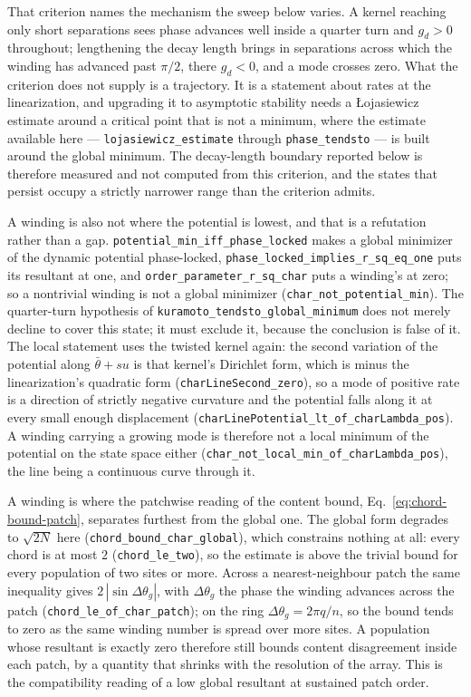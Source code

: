 \documentclass{article}
\begin{document}
That criterion names the mechanism the sweep below varies. A kernel reaching only short separations sees phase advances well inside a quarter turn and $g_d>0$ throughout; lengthening the decay length brings in separations across which the winding has advanced past $\pi/2$, there $g_d<0$, and a mode crosses zero. What the criterion does not supply is a trajectory. It is a statement about rates at the linearization, and upgrading it to asymptotic stability needs a \L{}ojasiewicz estimate around a critical point that is not a minimum, where the estimate available here --- \nolinkurl{lojasiewicz_estimate} through \nolinkurl{phase_tendsto} --- is built around the global minimum. The decay-length boundary reported below is therefore measured and not computed from this criterion, and the states that persist occupy a strictly narrower range than the criterion admits.

A winding is also not where the potential is lowest, and that is a refutation rather than a gap. \nolinkurl{potential_min_iff_phase_locked} makes a global minimizer of the dynamic potential phase-locked, \nolinkurl{phase_locked_implies_r_sq_eq_one} puts its resultant at one, and \nolinkurl{order_parameter_r_sq_char} puts a winding's at zero; so a nontrivial winding is not a global minimizer (\nolinkurl{char_not_potential_min}). The quarter-turn hypothesis of \nolinkurl{kuramoto_tendsto_global_minimum} does not merely decline to cover this state; it must exclude it, because the conclusion is false of it. The local statement uses the twisted kernel again: the second variation of the potential along $\bar\theta+su$ is that kernel's Dirichlet form, which is minus the linearization's quadratic form (\nolinkurl{charLineSecond_zero}), so a mode of positive rate is a direction of strictly negative curvature and the potential falls along it at every small enough displacement (\nolinkurl{charLinePotential_lt_of_charLambda_pos}). A winding carrying a growing mode is therefore not a local minimum of the potential on the state space either (\nolinkurl{char_not_local_min_of_charLambda_pos}), the line being a continuous curve through it.

A winding is where the patchwise reading of the content bound,
Eq.~\eqref{eq:chord-bound-patch}, separates furthest from the global one. The
global form degrades to $\sqrt{2N}$ here (\nolinkurl{chord_bound_char_global}), which constrains nothing at all: every chord is at most $2$ (\nolinkurl{chord_le_two}), so the estimate is above the trivial bound for every population of two sites or more. Across a nearest-neighbour patch the same inequality gives $2\,|\sin\Delta\theta_g|$, with $\Delta\theta_g$ the phase the winding advances across the patch (\nolinkurl{chord_le_of_char_patch}); on the ring $\Delta\theta_g=2\pi q/n$, so the bound tends to zero as the same winding number is spread over more sites. A population whose resultant is exactly zero therefore still bounds content disagreement inside each patch, by a quantity that shrinks with the resolution of the array. This is the compatibility reading of a low global resultant at sustained patch order.
\end{document}
